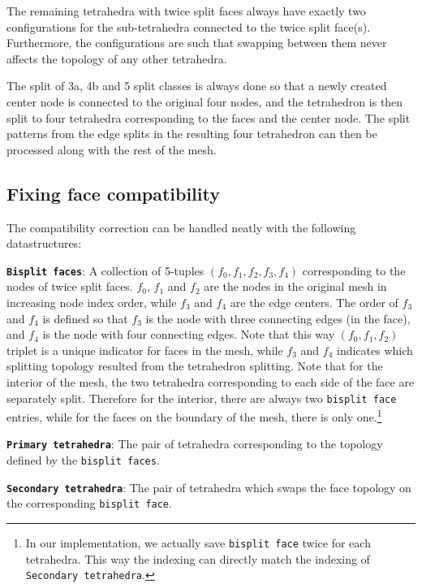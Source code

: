 \documentclass{article}
\begin{document}
	The remaining tetrahedra with twice split faces always have exactly two configurations for the sub-tetrahedra connected to the twice split face(s). Furthermore, the configurations are such that swapping between them never affects the topology of any other tetrahedra.

	The split of 3a, 4b and 5 split classes is always done so that a newly created center node is connected to the original four nodes, and the tetrahedron is then split to four tetrahedra corresponding to the faces and the center node. The split patterns from the edge splits in the resulting four tetrahedron can then be processed along with the rest of the mesh.

	\subsection{Fixing face compatibility}
	\label{sec:facecombatibility}
	The compatibility correction can be handled neatly with the following datastructures:

	\texttt{\textbf{Bisplit~faces}}: A collection of  5-tuples $(f_0, f_1, f_2, f_3, f_4)$ corresponding to the nodes of twice split faces. $f_0$, $f_1$ and $f_2$ are the nodes in the original mesh in increasing node index order, while $f_3$ and $f_4$ are the edge centers. The order of $f_3$ and $f_4$ is defined so that $f_3$ is the node with three connecting edges (in the face), and $f_4$ is the node with four connecting edges. Note that this way $(f_0, f_1, f_2)$ triplet is a unique indicator for faces in the mesh, while $f_3$ and $f_4$ indicates which splitting topology resulted from the tetrahedron splitting. Note that for the interior of the mesh, the two tetrahedra corresponding to each side of the face are separately split. Therefore for the interior, there are always two \texttt{bisplit~face} entries, while for the faces on the boundary of the mesh, there is only one.\footnote{In our implementation, we actually save \texttt{bisplit~face} twice for each tetrahedra. This way the indexing can directly match the indexing of \texttt{Secondary~tetrahedra}.}

	\texttt{\textbf{Primary~tetrahedra}}: The pair of tetrahedra corresponding to the topology defined by the \texttt{bisplit~faces}.

	\texttt{\textbf{Secondary~tetrahedra}}: The pair of tetrahedra which swaps the face topology on the corresponding \texttt{bisplit~face}.
\end{document}
